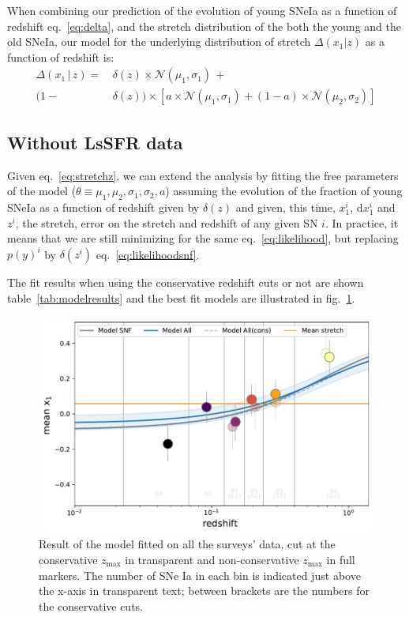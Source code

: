 \documentclass[]{aa} %
\begin{document}
When combining our prediction of the evolution of young SNeIa as a function of
redshift eq.~\ref{eq:delta}, and the stretch distribution of the both the young
and the old SNeIa, our model for the underlying distribution of stretch
$\Delta\left(x_1|z\right)$ as a function of redshift is:
\begin{align}
    \label{eq:stretchz}
    \Delta\left(x_1\,|\,z \right) = 
    &\,\delta(z)\times\mathcal{N}(\mu_1,\sigma_1)\,+\nonumber\\
    (1-&\,\delta(z)) \times \left[a\times\mathcal{N}(\mu_1,\sigma_1)
    + (1-a)\times\mathcal{N}(\mu_2,\sigma_2)\right]
\end{align}

\subsection{Without LsSFR data}
\label{sec:modelnopy}

Given eq.~\ref{eq:stretchz}, we can extend the analysis by fitting the free
parameters of the model ($\theta\equiv{\mu_1,\mu_2,\sigma_1,\sigma_2,a}$)
assuming the evolution of the fraction of young SNeIa as a function of redshift
given by $\delta(z)$ and given, this time, $x_1^{i}$,  $\mathrm{d}x^{i}_{1}$ and
$z^{i}$, the stretch, error on the stretch and redshift of any given SN $i$. In
practice, it means that we are still minimizing for the same
eq.~\ref{eq:likelihood}, but replacing $p(y)^{i}$ by $\delta(z^{i})$
eq.~\ref{eq:likelihoodsnf}. 

The fit results when using the conservative redshift cuts or not are shown
table~\ref{tab:modelresults} and the best fit models are illustrated in
fig.~\ref{fig:modelall}.
 
\begin{figure}
    \centering
    \includegraphics[width=\linewidth]{Article_figures/stretchevol_all_vs_snf_maglim-cuts.pdf}
    \caption{Result of the model fitted on all the surveys' data, cut at the
    conservative $z_{\mathrm{max}}$ in transparent and non-conservative
$z_{\mathrm{max}}$ in full markers. The number of SNe Ia in each bin is
indicated just above the x-axis in transparent text; between brackets are the
numbers for the conservative cuts.}
    \label{fig:modelall}
\end{figure}
\end{document}
